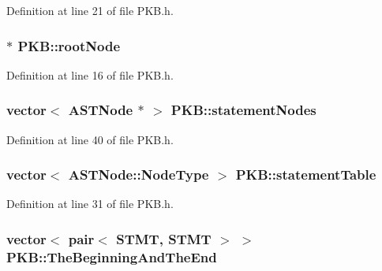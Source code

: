 Definition at line 21 of file P\-K\-B.\-h.

\hypertarget{class_p_k_b_a5978f3d40a8d0bb732ba708440d499b8}{
\subsubsection[{root\-Node}]{ $\ast$ P\-K\-B\-::root\-Node\hspace{0.3cm}{\ttfamily [static]}}}\label{class_p_k_b_a5978f3d40a8d0bb732ba708440d499b8}


Definition at line 16 of file P\-K\-B.\-h.

\hypertarget{class_p_k_b_a04aa565187bc3a566ac0163027e46f46}{
\subsubsection[{statement\-Nodes}]{\setlength{\rightskip}{0pt plus 5cm}vector$<$ {\bf A\-S\-T\-Node} $\ast$ $>$ P\-K\-B\-::statement\-Nodes\hspace{0.3cm}{\ttfamily [static]}}}\label{class_p_k_b_a04aa565187bc3a566ac0163027e46f46}


Definition at line 40 of file P\-K\-B.\-h.

\hypertarget{class_p_k_b_a295e1559f863827d703055a49a1b888b}{
\subsubsection[{statement\-Table}]{\setlength{\rightskip}{0pt plus 5cm}vector$<$ {\bf A\-S\-T\-Node\-::\-Node\-Type} $>$ P\-K\-B\-::statement\-Table\hspace{0.3cm}{\ttfamily [static]}}}\label{class_p_k_b_a295e1559f863827d703055a49a1b888b}


Definition at line 31 of file P\-K\-B.\-h.

\hypertarget{class_p_k_b_a960218307dbb38c796142a0f392205b6}{
\subsubsection[{The\-Beginning\-And\-The\-End}]{\setlength{\rightskip}{0pt plus 5cm}vector$<$ pair$<$ {\bf S\-T\-M\-T}, {\bf S\-T\-M\-T} $>$ $>$ P\-K\-B\-::\-The\-Beginning\-And\-The\-End\hspace{0.3cm}{\ttfamily [static]}}}\label{class_p_k_b_a960218307dbb38c796142a0f392205b6}


